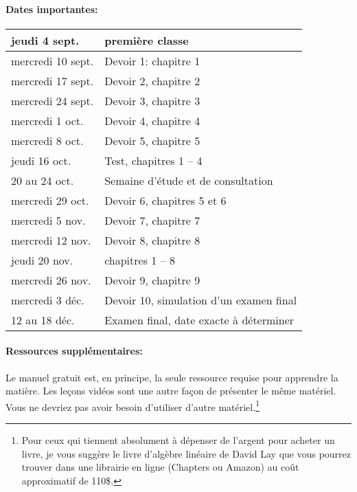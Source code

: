 \documentclass[11pt]{article}
\begin{document}
{\small
\paragraph*{Dates importantes:}
\begin{center}
\begin{tabular}{|l|l|}
\hline \rule{0pt}{0pt}  jeudi 4 sept. & première classe  \\ 
\hline \rule{0pt}{0pt}  mercredi 10 sept. &  Devoir 1: chapitre 1\\ 
\hline \rule{0pt}{0pt}  mercredi 17 sept. &  Devoir 2, chapitre 2\\ 
\hline \rule{0pt}{0pt}  mercredi 24 sept. &  Devoir 3, chapitre 3\\ 
\hline \rule{0pt}{0pt}  mercredi 1 oct. &  Devoir 4, chapitre 4\\
\hline \rule{0pt}{0pt}  mercredi 8 oct. &  Devoir 5, chapitre 5\\
\hline \rule{0pt}{0pt}  jeudi 16 oct. &  Test, chapitres 1 -- 4 \\ 
\hline \rule{0pt}{0pt} 20 au 24 oct.&  Semaine d'étude et de consultation\\ 
\hline \rule{0pt}{0pt}  mercredi 29 oct. &  Devoir 6, chapitres 5 et 6\\
\hline \rule{0pt}{0pt}  mercredi 5 nov. &  Devoir 7, chapitre 7\\ 
\hline \rule{0pt}{0pt}  mercredi 12 nov. &  Devoir 8, chapitre 8\\ 
\hline \rule{0pt}{0pt}  jeudi 20 nov. &  chapitres 1 -- 8\\ 
\hline \rule{0pt}{0pt}  mercredi 26 nov. &  Devoir 9, chapitre 9\\ 
\hline \rule{0pt}{0pt}  mercredi 3 déc. &  Devoir 10, simulation d'un examen final  \\ 
\hline \rule{0pt}{0pt} 12 au 18 déc. &  Examen final, date exacte à déterminer\\ 
\hline 
\end{tabular} 
\end{center}
}

\paragraph*{Ressources supplémentaires: } Le manuel gratuit est, en principe, la seule ressource requise pour apprendre la matière.
Les leçons vidéos sont une autre façon de présenter le même matériel. Vous ne devriez pas avoir besoin d'utiliser d'autre matériel.\footnote{
Pour ceux qui tiennent absolument à dépenser de l'argent pour acheter un  livre, je vous suggère le livre d'algèbre linéaire de  David Lay
que vous pourrez trouver dans une librairie en ligne (Chapters ou Amazon) au coût approximatif de 110\$.}
\end{document}
